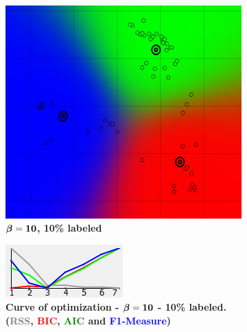 \begin{figure}[!h]
\centering
	\begin{subfigure}[h]{0.25\textwidth}
    \centering
	\includegraphics[height=0.08\textheight]{./clustering/opt_F1_10__soft_k__beta_10_range7.png}
	\caption{$\boldsymbol \beta \bf = 10$\bf, 10\% labeled}
    \label{fig:figure10a}
	\end{subfigure}
    \hspace{20mm}
    \begin{subfigure}[h]{0.50\textwidth}
    \centering
	\includegraphics[height=0.08\textheight]{./clustering/curve_opt_F1_10__soft_k__beta_10_range7.png}
	\caption{\bf Curve of optimization - $ \boldsymbol \beta \bf = 10$ - 10\% labeled. (\textcolor{gray}{RSS}, \textcolor{red}{BIC}, \textcolor{green}{AIC} and \textcolor{blue}{F1-Measure})}
    \label{fig:figure10c}
	\end{subfigure}\\
    \begin{subfigure}[h]{0.25\textwidth}
    \centering

\end{subfigure}
\end{figure}

